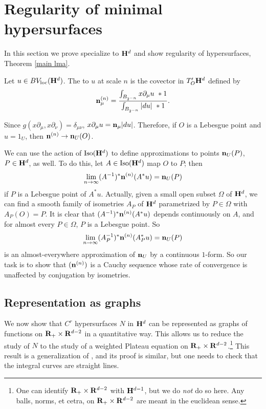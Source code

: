\section{Regularity of minimal hypersurfaces}\label{DeGiorgiSection}
In this section we prove specialize to $\mathbf H^d$ and show regularity of hypersurfaces, Theorem \ref{main lma}.

\begin{definition}
Let $u \in BV_{\mathrm{loc}}(\mathbf H^d)$. The  to $u$ at scale $n$ is the covector in $T_O' \mathbf H^d$ defined by
$$\mathbf n^{(n)}_\mu = \frac{\int_{B_{2^{-n}}} x \partial_\mu u ~*1}{\int_{B_{2^{-n}}} |du| ~*1}.$$
\end{definition}

Since $g(x\partial_\mu, x\partial_\nu) = \delta_{\mu\nu}$, $x\partial_\mu u = \mathbf n_\mu|du|$.
Therefore, if $O$ is a Lebesgue point and $u = 1_U$, then $\mathbf n^{(n)} \to \mathbf n_U(O)$.

We can use the action of $\operatorname{Iso}(\mathbf H^d)$ to define approximations to points $\mathbf n_U(P)$, $P \in \mathbf H^d$, as well.
To do this, let $A \in \operatorname{Iso}(\mathbf H^d)$ map $O$ to $P$; then
$$\lim_{n \to \infty} (A^{-1})^* \mathbf n^{(n)}(A^* u) = \mathbf n_U(P)$$
if $P$ is a Lebesgue point of $A^* u$.
Actually, given a small open subset $\Omega$ of $\mathbf H^d$, we can find a smooth family of isometries $A_P$ of $\mathbf H^d$ parametrized by $P \in \Omega$ with $A_P(O) = P$.
It is clear that $(A^{-1})^* \mathbf n^{(n)}(A^* u)$ depends continuously on $A$, and for almost every $P \in \Omega$, $P$ is a Lebesgue point.
So
$$\lim_{n \to \infty} (A_P^{-1})^* \mathbf n^{(n)}(A_P^* u) = \mathbf n_U(P)$$
is an almost-everywhere approximation of $\mathbf n_U$ by a continuous $1$-form.
So our task is to show that $(\mathbf n^{(n)})$ is a Cauchy sequence whose rate of convergence is unaffected by conjugation by isometries.

\subsection{Representation as graphs}

We now show that $C^r$ hypersurfaces $N$ in $\mathbf H^d$ can be represented as graphs of functions on $\mathbf{R}_+ \times \mathbf{R}^{d - 2}$ in a quantitative way.
This allows us to reduce the study of $N$ to the study of a weighted Plateau equation on $\mathbf{R}_+ \times \mathbf{R}^{d - 2}$.\footnote{One can identify $\mathbf{R}_+ \times \mathbf{R}^{d - 2}$ with $\mathbf H^{d - 1}$, but we do \emph{not} do so here. Any balls, norms, et cetra, on $\mathbf{R}_+ \times \mathbf{R}^{d - 2}$ are meant in the euclidean sense.}
This result is a generalization of \cite[Theorem 4.8]{Giusti77}, and its proof is similar, but one needs to check that the integral curves are straight lines.

